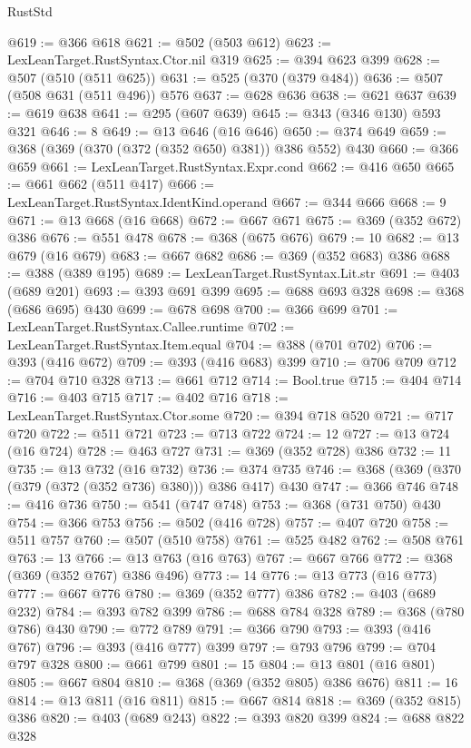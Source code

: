 \begin{lexlean}{RustStd}
\begin{coremodule}
{\begin{coremodule}
{{{{{{{{{{@619 := @366 @618
@621 := @502 (@503 @612)
@623 := LexLeanTarget.RustSyntax.Ctor.nil @319
@625 := @394 @623 @399
@628 := @507 (@510 (@511 @625))
@631 := @525 (@370 (@379 @484))
@636 := @507 (@508 @631 (@511 @496)) @576
@637 := @628 @636
@638 := @621 @637
@639 := @619 @638
@641 := @295 (@607 @639)
@645 := @343 (@346 @130) @593 @321
@646 := 8
@649 := @13 @646 (@16 @646)
@650 := @374 @649
@659 := @368 (@369 (@370 (@372 (@352 @650) @381)) @386 @552) @430
@660 := @366 @659
@661 := LexLeanTarget.RustSyntax.Expr.cond
@662 := @416 @650
@665 := @661 @662 (@511 @417)
@666 := LexLeanTarget.RustSyntax.IdentKind.operand
@667 := @344 @666
@668 := 9
@671 := @13 @668 (@16 @668)
@672 := @667 @671
@675 := @369 (@352 @672) @386
@676 := @551 @478
@678 := @368 (@675 @676)
@679 := 10
@682 := @13 @679 (@16 @679)
@683 := @667 @682
@686 := @369 (@352 @683) @386
@688 := @388 (@389 @195)
@689 := LexLeanTarget.RustSyntax.Lit.str
@691 := @403 (@689 @201)
@693 := @393 @691 @399
@695 := @688 @693 @328
@698 := @368 (@686 @695) @430
@699 := @678 @698
@700 := @366 @699
@701 := LexLeanTarget.RustSyntax.Callee.runtime
@702 := LexLeanTarget.RustSyntax.Item.equal
@704 := @388 (@701 @702)
@706 := @393 (@416 @672)
@709 := @393 (@416 @683) @399
@710 := @706 @709
@712 := @704 @710 @328
@713 := @661 @712
@714 := Bool.true
@715 := @404 @714
@716 := @403 @715
@717 := @402 @716
@718 := LexLeanTarget.RustSyntax.Ctor.some
@720 := @394 @718 @520
@721 := @717 @720
@722 := @511 @721
@723 := @713 @722
@724 := 12
@727 := @13 @724 (@16 @724)
@728 := @463 @727
@731 := @369 (@352 @728) @386
@732 := 11
@735 := @13 @732 (@16 @732)
@736 := @374 @735
@746 := @368 (@369 (@370 (@379 (@372 (@352 @736) @380))) @386 @417) @430
@747 := @366 @746
@748 := @416 @736
@750 := @541 (@747 @748)
@753 := @368 (@731 @750) @430
@754 := @366 @753
@756 := @502 (@416 @728)
@757 := @407 @720
@758 := @511 @757
@760 := @507 (@510 @758)
@761 := @525 @482
@762 := @508 @761
@763 := 13
@766 := @13 @763 (@16 @763)
@767 := @667 @766
@772 := @368 (@369 (@352 @767) @386 @496)
@773 := 14
@776 := @13 @773 (@16 @773)
@777 := @667 @776
@780 := @369 (@352 @777) @386
@782 := @403 (@689 @232)
@784 := @393 @782 @399
@786 := @688 @784 @328
@789 := @368 (@780 @786) @430
@790 := @772 @789
@791 := @366 @790
@793 := @393 (@416 @767)
@796 := @393 (@416 @777) @399
@797 := @793 @796
@799 := @704 @797 @328
@800 := @661 @799
@801 := 15
@804 := @13 @801 (@16 @801)
@805 := @667 @804
@810 := @368 (@369 (@352 @805) @386 @676)
@811 := 16
@814 := @13 @811 (@16 @811)
@815 := @667 @814
@818 := @369 (@352 @815) @386
@820 := @403 (@689 @243)
@822 := @393 @820 @399
@824 := @688 @822 @328
}}}}}}}}}}
\end{coremodule}}
\end{coremodule}
\end{lexlean}
